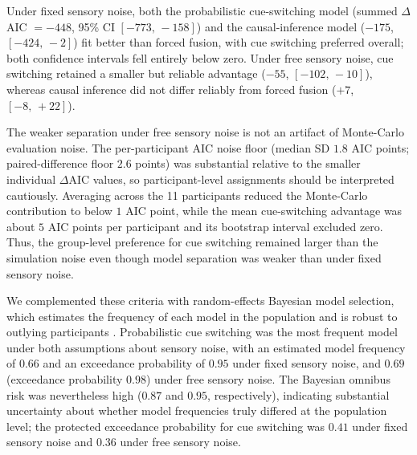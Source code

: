 \documentclass{jov}
\providecommand{\citep}[1]{\cite{#1}}
\begin{document}
Under fixed sensory noise, both the probabilistic cue-switching model (summed $\Delta$AIC $= -448$, 95\% CI $[-773,\,-158]$) and the causal-inference model ($-175$, $[-424,\,-2]$) fit better than forced fusion, with cue switching preferred overall; both confidence intervals fell entirely below zero. Under free sensory noise, cue switching retained a smaller but reliable advantage ($-55$, $[-102,\,-10]$), whereas causal inference did not differ reliably from forced fusion ($+7$, $[-8,\,+22]$).

The weaker separation under free sensory noise is not an artifact of Monte-Carlo evaluation noise. The per-participant AIC noise floor (median SD $1.8$ AIC points; paired-difference floor $2.6$ points) was substantial relative to the smaller individual $\Delta$AIC values, so participant-level assignments should be interpreted cautiously. Averaging across the 11 participants reduced the Monte-Carlo contribution to below $1$ AIC point, while the mean cue-switching advantage was about $5$ AIC points per participant and its bootstrap interval excluded zero. Thus, the group-level preference for cue switching remained larger than the simulation noise even though model separation was weaker than under fixed sensory noise.



We complemented these criteria with random-effects Bayesian model selection, which estimates the frequency of each model in the population and is robust to outlying participants \citep{stephan2009bayesian,rigoux2014bayesian}. Probabilistic cue switching was the most frequent model under both assumptions about sensory noise, with an estimated model frequency of $0.66$ and an exceedance probability of $0.95$ under fixed sensory noise, and $0.69$ (exceedance probability $0.98$) under free sensory noise. The Bayesian omnibus risk was nevertheless high ($0.87$ and $0.95$, respectively), indicating substantial uncertainty about whether model frequencies truly differed at the population level; the protected exceedance probability for cue switching was $0.41$ under fixed sensory noise and $0.36$ under free sensory noise.
\end{document}
